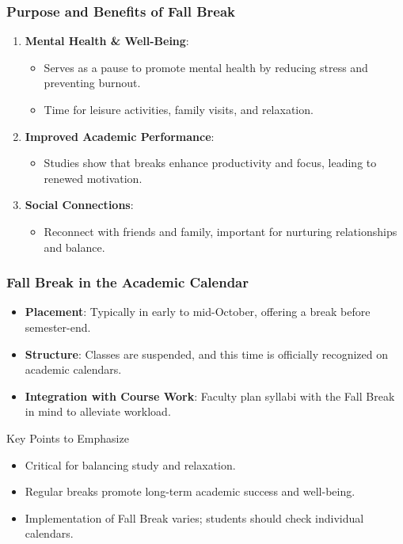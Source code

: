 \documentclass[aspectratio=169]{beamer}
\begin{document}
\begin{frame}[fragile]
    \frametitle{Purpose and Benefits of Fall Break}
    \begin{enumerate}
        \item \textbf{Mental Health \& Well-Being}:
            \begin{itemize}
                \item Serves as a pause to promote mental health by reducing stress and preventing burnout.
                \item Time for leisure activities, family visits, and relaxation.
            \end{itemize}
        
        \item \textbf{Improved Academic Performance}:
            \begin{itemize}
                \item Studies show that breaks enhance productivity and focus, leading to renewed motivation.
            \end{itemize}
        
        \item \textbf{Social Connections}:
            \begin{itemize}
                \item Reconnect with friends and family, important for nurturing relationships and balance.
            \end{itemize}
    \end{enumerate}
\end{frame}

\begin{frame}[fragile]
    \frametitle{Fall Break in the Academic Calendar}
    \begin{itemize}
        \item \textbf{Placement}: Typically in early to mid-October, offering a break before semester-end.
        \item \textbf{Structure}: Classes are suspended, and this time is officially recognized on academic calendars.
        \item \textbf{Integration with Course Work}: Faculty plan syllabi with the Fall Break in mind to alleviate workload.
    \end{itemize}
    
    \begin{block}{Key Points to Emphasize}
        \begin{itemize}
            \item Critical for balancing study and relaxation.
            \item Regular breaks promote long-term academic success and well-being.
            \item Implementation of Fall Break varies; students should check individual calendars.
        \end{itemize}
    \end{block}
\end{frame}
\end{document}
